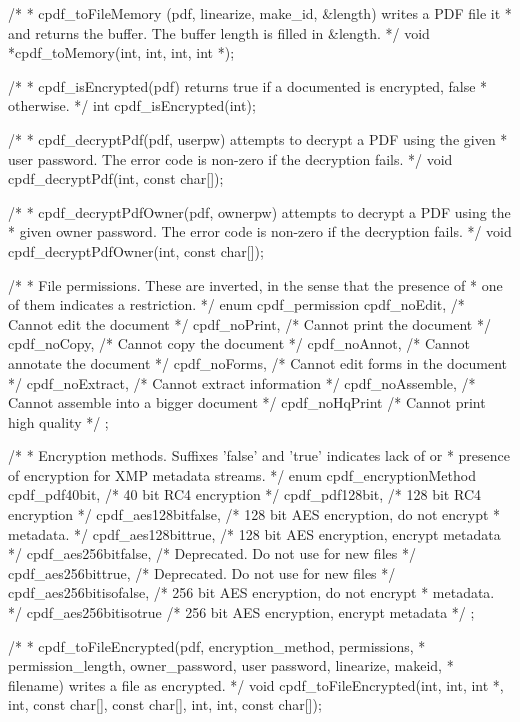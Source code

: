 /*
 * cpdf_toFileMemory (pdf, linearize, make_id, &length) writes a PDF file it
 * and returns the buffer. The buffer length is filled in &length.
 */
void *cpdf_toMemory(int, int, int, int *);

/*
 * cpdf_isEncrypted(pdf) returns true if a documented is encrypted, false
 * otherwise.
 */
int cpdf_isEncrypted(int);

/*
 * cpdf_decryptPdf(pdf, userpw) attempts to decrypt a PDF using the given
 * user password. The error code is non-zero if the decryption fails.
 */
void cpdf_decryptPdf(int, const char[]);

/*
 * cpdf_decryptPdfOwner(pdf, ownerpw) attempts to decrypt a PDF using the
 * given owner password. The error code is non-zero if the decryption fails.
 */
void cpdf_decryptPdfOwner(int, const char[]);

/*
 * File permissions. These are inverted, in the sense that the presence of
 * one of them indicates a restriction.
 */
enum cpdf_permission {
  cpdf_noEdit,     /* Cannot edit the document */
  cpdf_noPrint,    /* Cannot print the document */
  cpdf_noCopy,     /* Cannot copy the document */
  cpdf_noAnnot,    /* Cannot annotate the document */
  cpdf_noForms,    /* Cannot edit forms in the document */
  cpdf_noExtract,  /* Cannot extract information */
  cpdf_noAssemble, /* Cannot assemble into a bigger document */
  cpdf_noHqPrint   /* Cannot print high quality */
};

/*
 * Encryption methods. Suffixes 'false' and 'true' indicates lack of or
 * presence of encryption for XMP metadata streams.
 */
enum cpdf_encryptionMethod {
  cpdf_pdf40bit,          /* 40 bit RC4 encryption */
  cpdf_pdf128bit,         /* 128 bit RC4 encryption */
  cpdf_aes128bitfalse,    /* 128 bit AES encryption, do not encrypt
                           * metadata. */
  cpdf_aes128bittrue,     /* 128 bit AES encryption, encrypt metadata */
  cpdf_aes256bitfalse,    /* Deprecated. Do not use for new files */
  cpdf_aes256bittrue,     /* Deprecated. Do not use for new files */
  cpdf_aes256bitisofalse, /* 256 bit AES encryption, do not encrypt
                           * metadata. */
  cpdf_aes256bitisotrue   /* 256 bit AES encryption, encrypt metadata */
};

/*
 * cpdf_toFileEncrypted(pdf, encryption_method, permissions,
 * permission_length, owner_password, user password, linearize, makeid,
 * filename) writes a file as encrypted.
 */
void cpdf_toFileEncrypted(int, int, int *, int, const char[], const char[], int,
                          int, const char[]);

